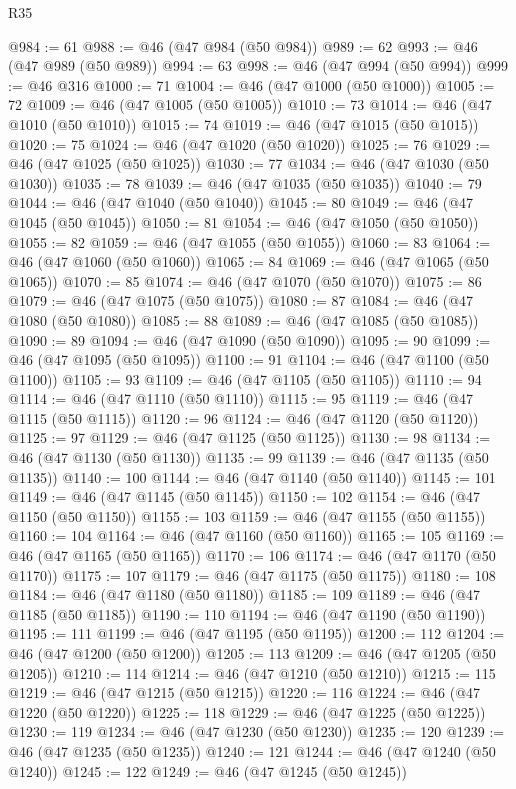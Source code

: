 \begin{lexlean}{R35}
\begin{coremodule}
@984 := 61
@988 := @46 (@47 @984 (@50 @984))
@989 := 62
@993 := @46 (@47 @989 (@50 @989))
@994 := 63
@998 := @46 (@47 @994 (@50 @994))
@999 := @46 @316
@1000 := 71
@1004 := @46 (@47 @1000 (@50 @1000))
@1005 := 72
@1009 := @46 (@47 @1005 (@50 @1005))
@1010 := 73
@1014 := @46 (@47 @1010 (@50 @1010))
@1015 := 74
@1019 := @46 (@47 @1015 (@50 @1015))
@1020 := 75
@1024 := @46 (@47 @1020 (@50 @1020))
@1025 := 76
@1029 := @46 (@47 @1025 (@50 @1025))
@1030 := 77
@1034 := @46 (@47 @1030 (@50 @1030))
@1035 := 78
@1039 := @46 (@47 @1035 (@50 @1035))
@1040 := 79
@1044 := @46 (@47 @1040 (@50 @1040))
@1045 := 80
@1049 := @46 (@47 @1045 (@50 @1045))
@1050 := 81
@1054 := @46 (@47 @1050 (@50 @1050))
@1055 := 82
@1059 := @46 (@47 @1055 (@50 @1055))
@1060 := 83
@1064 := @46 (@47 @1060 (@50 @1060))
@1065 := 84
@1069 := @46 (@47 @1065 (@50 @1065))
@1070 := 85
@1074 := @46 (@47 @1070 (@50 @1070))
@1075 := 86
@1079 := @46 (@47 @1075 (@50 @1075))
@1080 := 87
@1084 := @46 (@47 @1080 (@50 @1080))
@1085 := 88
@1089 := @46 (@47 @1085 (@50 @1085))
@1090 := 89
@1094 := @46 (@47 @1090 (@50 @1090))
@1095 := 90
@1099 := @46 (@47 @1095 (@50 @1095))
@1100 := 91
@1104 := @46 (@47 @1100 (@50 @1100))
@1105 := 93
@1109 := @46 (@47 @1105 (@50 @1105))
@1110 := 94
@1114 := @46 (@47 @1110 (@50 @1110))
@1115 := 95
@1119 := @46 (@47 @1115 (@50 @1115))
@1120 := 96
@1124 := @46 (@47 @1120 (@50 @1120))
@1125 := 97
@1129 := @46 (@47 @1125 (@50 @1125))
@1130 := 98
@1134 := @46 (@47 @1130 (@50 @1130))
@1135 := 99
@1139 := @46 (@47 @1135 (@50 @1135))
@1140 := 100
@1144 := @46 (@47 @1140 (@50 @1140))
@1145 := 101
@1149 := @46 (@47 @1145 (@50 @1145))
@1150 := 102
@1154 := @46 (@47 @1150 (@50 @1150))
@1155 := 103
@1159 := @46 (@47 @1155 (@50 @1155))
@1160 := 104
@1164 := @46 (@47 @1160 (@50 @1160))
@1165 := 105
@1169 := @46 (@47 @1165 (@50 @1165))
@1170 := 106
@1174 := @46 (@47 @1170 (@50 @1170))
@1175 := 107
@1179 := @46 (@47 @1175 (@50 @1175))
@1180 := 108
@1184 := @46 (@47 @1180 (@50 @1180))
@1185 := 109
@1189 := @46 (@47 @1185 (@50 @1185))
@1190 := 110
@1194 := @46 (@47 @1190 (@50 @1190))
@1195 := 111
@1199 := @46 (@47 @1195 (@50 @1195))
@1200 := 112
@1204 := @46 (@47 @1200 (@50 @1200))
@1205 := 113
@1209 := @46 (@47 @1205 (@50 @1205))
@1210 := 114
@1214 := @46 (@47 @1210 (@50 @1210))
@1215 := 115
@1219 := @46 (@47 @1215 (@50 @1215))
@1220 := 116
@1224 := @46 (@47 @1220 (@50 @1220))
@1225 := 118
@1229 := @46 (@47 @1225 (@50 @1225))
@1230 := 119
@1234 := @46 (@47 @1230 (@50 @1230))
@1235 := 120
@1239 := @46 (@47 @1235 (@50 @1235))
@1240 := 121
@1244 := @46 (@47 @1240 (@50 @1240))
@1245 := 122
@1249 := @46 (@47 @1245 (@50 @1245))

\end{coremodule}
\end{lexlean}
